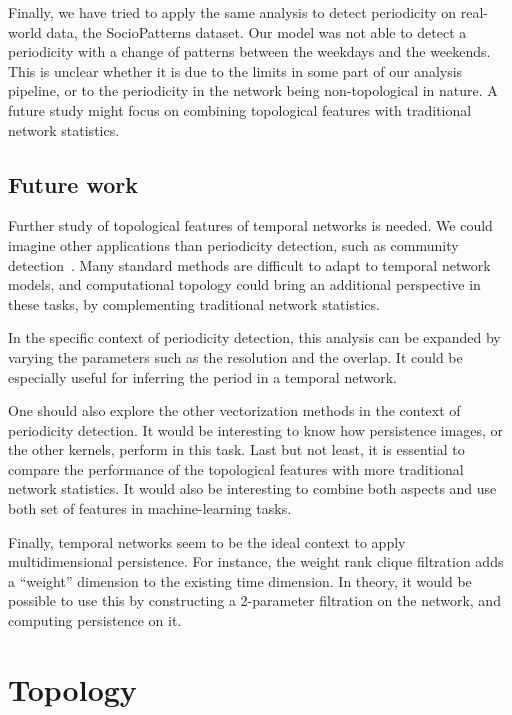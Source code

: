 \documentclass[a4paper,11pt,openany,extrafontsizes]{memoir}
\begin{document}
Finally, we have tried to apply the same analysis to detect
periodicity on real-world data, the SocioPatterns dataset. Our model
was not able to detect a periodicity with a change of patterns between
the weekdays and the weekends. This is unclear whether it is due to
the limits in some part of our analysis pipeline, or to the
periodicity in the network being non-topological in nature. A future
study might focus on combining topological features with traditional
network statistics.

\section{Future work}%
\label{sec:future-work}

Further study of topological features of temporal networks is
needed. We could imagine other applications than periodicity
detection, such as community
detection~\cite{girvan_community_2002}. Many standard methods are
difficult to adapt to temporal network models, and computational
topology could bring an additional perspective in these tasks, by
complementing traditional network statistics.

In the specific context of periodicity detection, this analysis can be
expanded by varying the parameters such as the resolution and the
overlap. It could be especially useful for inferring the period in a
temporal network.

One should also explore the other vectorization methods in the context
of periodicity detection. It would be interesting to know how
persistence images, or the other kernels, perform in this task. Last
but not least, it is essential to compare the performance of the
topological features with more traditional network statistics. It
would also be interesting to combine both aspects and use both set of
features in machine-learning tasks.

Finally, temporal networks seem to be the ideal context to apply
multidimensional persistence. For instance, the weight rank clique
filtration adds a ``weight'' dimension to the existing time
dimension. In theory, it would be possible to use this by constructing
a 2-parameter filtration on the network, and computing persistence on
it.




\appendix

\chapter{Topology}%
\label{cha:topology}
\end{document}
